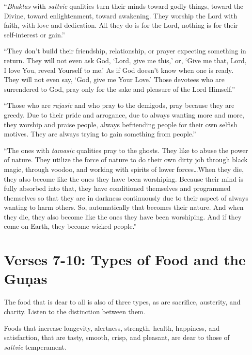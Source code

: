 \enquote{\textit{Bhaktas} with \textit{sattvic} qualities turn their minds toward godly things, toward the Divine, toward enlightenment, toward awakening. They worship the Lord with faith, with love and dedication. All they do is for the Lord, nothing is for their self-interest or gain.}

\enquote{They don’t build their friendship, relationship, or prayer expecting something in return. They will not even ask God, \enquote{Lord, give me this,} or, \enquote{Give me that, Lord, I love You, reveal Yourself to me.} As if God doesn’t know when one is ready. They will not even say, \enquote{God, give me Your Love.} Those devotees who are surrendered to God, pray only for the sake and pleasure of the Lord Himself.}

\enquote{Those who are \textit{rajasic} and who pray to the demigods, pray because they are greedy. Due to their pride and arrogance, due to always wanting more and more, they worship and praise people, always befriending people for their own selfish motives. They are always trying to gain something from people.}

\enquote{The ones with \textit{tamasic} qualities pray to the ghosts. They like to abuse the power of nature. They utilize the force of nature to do their own dirty job through black magic, through voodoo, and working with spirits of lower forces\ldots When they die, they also become like the ones they have been worshiping. Because their mind is fully absorbed into that, they have conditioned themselves and programmed themselves so that they are in darkness continuously due to their aspect of always wanting to harm others. So, automatically that becomes their nature. And when they die, they also become like the ones they have been worshiping. And if they come on Earth, they become wicked people.}

\section{Verses 7-10: Types of Food and the Guṇas}\label{sec-verses-7-10-types-of-food-and-the-gunas}

{The food that is dear to all is also of three types, as are sacrifice, austerity, and charity. Listen to the distinction between them.}

{Foods that increase longevity, alertness, strength, health, happiness, and satisfaction, that are tasty, smooth, crisp, and pleasant, are dear to those of \textit{sattvic} temperament.}


